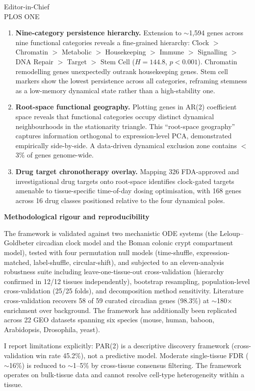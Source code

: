 \documentclass[11pt]{letter}
\begin{document}
\begin{letter}{Editor-in-Chief \\ PLOS ONE}
\begin{enumerate}
\item \textbf{Nine-category persistence hierarchy.} Extension to $\sim$1,594 genes across nine functional categories reveals a fine-grained hierarchy: Clock $>$ Chromatin $>$ Metabolic $>$ Housekeeping $>$ Immune $>$ Signalling $>$ DNA Repair $>$ Target $>$ Stem Cell ($H=144.8$, $p<0.001$). Chromatin remodelling genes unexpectedly outrank housekeeping genes. Stem cell markers show the lowest persistence across all categories, reframing stemness as a low-memory dynamical state rather than a high-stability one.

\item \textbf{Root-space functional geography.} Plotting genes in AR(2) coefficient space reveals that functional categories occupy distinct dynamical neighbourhoods in the stationarity triangle. This ``root-space geography'' captures information orthogonal to expression-level PCA, demonstrated empirically side-by-side. A data-driven dynamical exclusion zone contains $<$3\% of genes genome-wide.

\item \textbf{Drug target chronotherapy overlay.} Mapping 326 FDA-approved and investigational drug targets onto root-space identifies clock-gated targets amenable to tissue-specific time-of-day dosing optimisation, with 168 genes across 16 drug classes positioned relative to the four dynamical poles.

\end{enumerate}

\textbf{Methodological rigour and reproducibility}

The framework is validated against two mechanistic ODE systems (the Leloup--Goldbeter circadian clock model and the Boman colonic crypt compartment model), tested with four permutation null models (time-shuffle, expression-matched, label-shuffle, circular-shift), and subjected to an eleven-analysis robustness suite including leave-one-tissue-out cross-validation (hierarchy confirmed in 12/12 tissues independently), bootstrap resampling, population-level cross-validation (25/25 folds), and decomposition method sensitivity. Literature cross-validation recovers 58 of 59 curated circadian genes (98.3\%) at $\sim$180$\times$ enrichment over background. The framework has additionally been replicated across 22 GEO datasets spanning six species (mouse, human, baboon, Arabidopsis, Drosophila, yeast).

I report limitations explicitly: PAR(2) is a descriptive discovery framework (cross-validation win rate 45.2\%), not a predictive model. Moderate single-tissue FDR ($\sim$16\%) is reduced to $\sim$1--5\% by cross-tissue consensus filtering. The framework operates on bulk-tissue data and cannot resolve cell-type heterogeneity within a tissue.


\end{letter}
\end{document}
